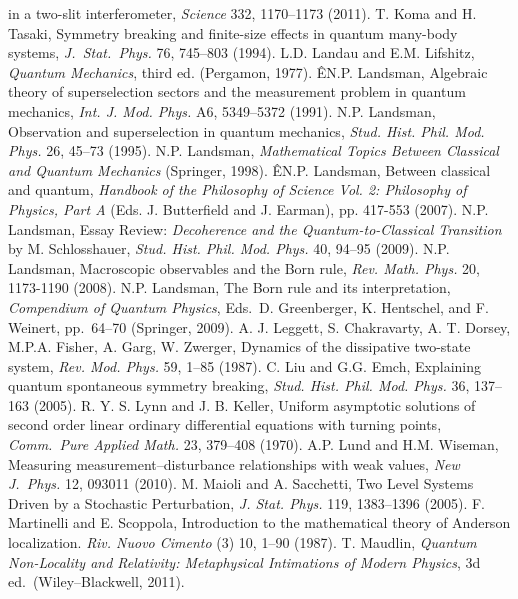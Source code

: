 \documentclass[12pt]{article}
\begin{document}
\begin{thebibliography}{99}
\begin{footnotesize}
in a two-slit interferometer, \emph{Science} 332, 1170--1173 (2011). 
 T. Koma and H. Tasaki, Symmetry breaking and finite-size effects in quantum many-body systems,  \emph{J.\ Stat.\ Phys.}  76, 745--803 (1994).
 L.D. Landau and E.M. Lifshitz, {\it Quantum Mechanics}, third ed. (Pergamon, 1977). 
 ÊN.P. Landsman,
Algebraic
theory of superselection sectors and the measurement problem in
quantum mechanics, \emph{ Int. J. Mod. Phys.}
A6, 5349--5372 (1991). 
  N.P. Landsman,
  Observation and superselection in quantum mechanics, \emph{Stud. Hist. Phil. Mod. Phys.} 26, 45--73 (1995).
 N.P. Landsman, {\it Mathematical Topics Between Classical and Quantum Mechanics} (Springer, 1998).        
 ÊN.P. Landsman,  Between classical and quantum, {\it Handbook of the Philosophy of Science Vol. 2: Philosophy of Physics, Part A} (Eds. J. Butterfield and J. Earman),  pp. 417-553 (2007).
  N.P. Landsman, Essay Review: \emph{Decoherence and the Quantum-to-Classical Transition} by M. Schlosshauer,
\emph{ Stud. Hist. Phil. Mod. Phys.} 40, 94--95 (2009).
   N.P. Landsman, Macroscopic observables and the Born rule, \emph{Rev. Math. Phys.} 20, 1173-1190 (2008).
     N.P. Landsman, The Born rule and its interpretation,   {\it Compendium of Quantum Physics},  Eds.\ D. Greenberger, K. Hentschel, and F. Weinert, pp.\ 64--70 (Springer, 2009).
  A. J. Leggett, S. Chakravarty, A. T. Dorsey, M.P.A. Fisher, A. Garg, W. Zwerger, Dynamics of the dissipative two-state system,
 \emph{Rev. Mod. Phys.}  59, 1--85 (1987). 
  C. Liu and G.G. Emch, Explaining quantum spontaneous symmetry breaking,
  \emph{Stud. Hist. Phil. Mod. Phys.} 36, 137--163  (2005).
    R. Y. S. Lynn and J. B. Keller, Uniform asymptotic solutions of second order linear ordinary differential equations with turning points, \emph{Comm.\ Pure Applied Math.} 23, 379--408 (1970).
    A.P. Lund and H.M. Wiseman, Measuring measurement--disturbance relationships with weak values,  \emph{New J.\ Phys.} 12, 093011
   (2010). 
 M. Maioli and A. Sacchetti, Two Level Systems Driven by a Stochastic Perturbation,
\emph{J. Stat. Phys.}  119, 1383--1396  (2005).
  F. Martinelli and E. Scoppola, Introduction to the mathematical theory of Anderson localization.
 \emph{Riv. Nuovo Cimento} (3) 10, 1--90 (1987).
 	 T. Maudlin, \emph{Quantum Non-Locality and Relativity: Metaphysical Intimations of Modern Physics}, 3d ed.\ (Wiley--Blackwell, 2011).

\end{footnotesize}
\end{thebibliography}
\end{document}

